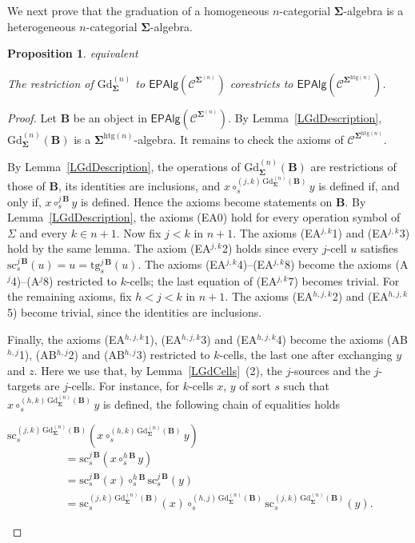 \documentclass[a4paper, reqno]{amsbook}
\makeatletter
\newcommand{\sig}[1]{\mathbf{#1}}             %
\newcommand{\spec}[1]{\boldsymbol{\mathcal{#1}}} %
\newcommand{\htg}{\mathrm{htg}}                %
\newcommand{\src}{\mathrm{sc}}
\newcommand{\tgt}{\mathrm{tg}}
\newcommand{\Gd}{\mathrm{Gd}}
\theoremstyle{plain}
\newtheorem{proposition}[theorem]{Proposition}
\theoremstyle{definition}
\newcommand*{\CA@leanpending}{}
\newcommand*{\CA@leanrelation}{}
\newcommand*{\lean}[2]{%
  \ifcsname\string\color@lean@#1\endcsname\else
    \PackageError{main}{Unknown relation `#1' in \string\lean}{Use equivalent, weaker or stronger.}%
  \fi
  \gdef\CA@leanrelation{#1}%
  \gdef\CA@leanpending{#2}}
\makeatother
\begin{document}
We next prove that the graduation of a homogeneous $n$-categorial $\sig{\Sigma}$-algebra is a heterogeneous $n$-categorial $\sig{\Sigma}$-algebra.

\begin{proposition}\label{PGdEpVariety}\lean{equivalent}{Presentations.graduation_isModel,Presentations.graduationModels}
The restriction of $\Gd^{(n)}_{\sig{\Sigma}}$ to $\mathsf{EPAlg}(\spec{C}^{\sig{\Sigma}^{(n)}})$ corestricts to $\mathsf{EPAlg}(\spec{C}^{\sig{\Sigma}^{\htg(n)}})$.
\end{proposition}
\begin{proof}
Let $\mathbf{B}$ be an object in $\mathsf{EPAlg}(\spec{C}^{\sig{\Sigma}^{(n)}})$.
By Lemma~\ref{LGdDescription}, $\Gd^{(n)}_{\sig{\Sigma}}(\mathbf{B})$ is a $\sig{\Sigma}^{\htg(n)}$-algebra.
It remains to check the axioms of $\spec{C}^{\sig{\Sigma}^{\htg(n)}}$.

By Lemma~\ref{LGdDescription}, the operations of $\Gd^{(n)}_{\sig{\Sigma}}(\mathbf{B})$ are restrictions of those of $\mathbf{B}$, its identities are inclusions, and $x\circ^{(j,k)\,\Gd^{(n)}_{\sig{\Sigma}}(\mathbf{B})}_{s}y$ is defined if, and only if, $x\circ^{j\,\mathbf{B}}_{s}y$ is defined.
Hence the axioms become statements on $\mathbf{B}$.
By Lemma~\ref{LGdDescription}, the axioms (EA0) hold for every operation symbol of $\Sigma$ and every $k\in n+1$.
Now fix $j<k$ in $n+1$.
The axioms (EA$^{j,k}$1) and (EA$^{j,k}$3) hold by the same lemma.
The axiom (EA$^{j,k}$2) holds since every $j$-cell $u$ satisfies $\src^{j\,\mathbf{B}}_{s}(u)=u=\tgt^{j\,\mathbf{B}}_{s}(u)$.
The axioms (EA$^{j,k}$4)--(EA$^{j,k}$8) become the axioms (A$^{j}$4)--(A$^{j}$8) restricted to $k$-cells; the last equation of (EA$^{j,k}$7) becomes trivial.
For the remaining axioms, fix $h<j<k$ in $n+1$.
The axioms (EA$^{h,j,k}$2) and (EA$^{h,j,k}$5) become trivial, since the identities are inclusions.

Finally, the axioms (EA$^{h,j,k}$1), (EA$^{h,j,k}$3) and (EA$^{h,j,k}$4) become the axioms (AB$^{h,j}$1), (AB$^{h,j}$2) and (AB$^{h,j}$3) restricted to $k$-cells, the last one after exchanging $y$ and $z$.
Here we use that, by Lemma~\ref{LGdCells}~(2), the $j$-sources and the $j$-targets are $j$-cells.
For instance, for $k$-cells $x$, $y$ of sort $s$ such that $x\circ^{(h,k)\,\Gd^{(n)}_{\sig{\Sigma}}(\mathbf{B})}_{s}y$ is defined, the following chain of equalities holds
\begin{flushleft}
	$\src^{(j,k)\,\Gd^{(n)}_{\sig{\Sigma}}(\mathbf{B})}_{s}\left(x\circ^{(h,k)\,\Gd^{(n)}_{\sig{\Sigma}}(\mathbf{B})}_{s}y\right)$
\begin{align*}
\quad
&=
\src^{j\,\mathbf{B}}_{s}\left(x\circ^{h\,\mathbf{B}}_{s}y\right)
\tag{1}
\\&=
\src^{j\,\mathbf{B}}_{s}(x)\circ^{h\,\mathbf{B}}_{s}\src^{j\,\mathbf{B}}_{s}(y)
\tag{2}
\\&=
\src^{(j,k)\,\Gd^{(n)}_{\sig{\Sigma}}(\mathbf{B})}_{s}(x)
\circ^{(h,j)\,\Gd^{(n)}_{\sig{\Sigma}}(\mathbf{B})}_{s}\src^{(j,k)\,\Gd^{(n)}_{\sig{\Sigma}}(\mathbf{B})}_{s}(y).
\tag{3}
\end{align*}
\end{flushleft}


\end{proof}
\end{document}
